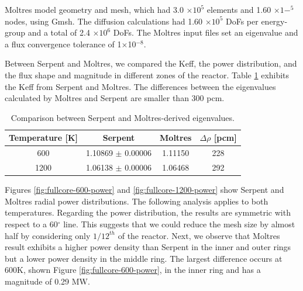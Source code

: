 Moltres model geometry and mesh, which had 3.0 $\times 10^5$ elements and 1.60 $\times 1-^5$ nodes, using Gmsh.
The diffusion calculations had 1.60 $\times 10^5$ \glspl{DoF} per energy-group and a total of 2.4 $\times 10^6$ DoFs.
The Moltres input files set an eigenvalue and a flux convergence tolerance of 1$\times$10$^{-8}$.

Between Serpent and Moltres, we compared the \gls{Keff}, the power distribution, and the flux shape and magnitude in different zones of the reactor.
Table \ref{tab:full-keff} exhibits the \gls{Keff} from Serpent and Moltres.
The differences between the eigenvalues calculated by Moltres and Serpent are smaller than 300 pcm.

\begin{table}[htbp!]
  \centering
  \caption{Comparison between Serpent and Moltres-derived eigenvalues.}
  \begin{tabular}{cccc}
  \toprule
  Temperature [K] & Serpent			     & Moltres  & $\Delta \rho$ [pcm] 	\\
  \midrule
			 600  	    & 1.10869 $\pm$ 0.00006  & 1.11150	 &	228		\\
			1200 	      & 1.06138 $\pm$ 0.00006  & 1.06468	 &	292   \\
  \bottomrule
  \end{tabular}
  \label{tab:full-keff}
\end{table}

Figures \ref{fig:fullcore-600-power} and \ref{fig:fullcore-1200-power} show Serpent and Moltres radial power distributions.
The following analysis applies to both temperatures.
Regarding the power distribution, the results are symmetric with respect to a 60$^{\circ}$ line.
This suggests that we could reduce the mesh size by almost half by considering only $1/12^{th}$ of the reactor.
Next, we observe that Moltres result exhibits a higher power density than Serpent in the inner and outer rings but a lower power density in the middle ring.
The largest difference occurs at 600K, shown Figure \ref{fig:fullcore-600-power}, in the inner ring and has a magnitude of 0.29 MW.

